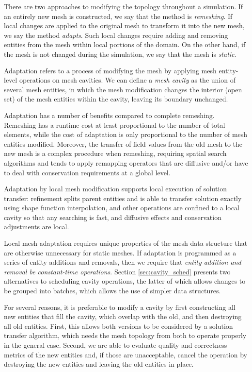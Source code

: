 There are two approaches to modifying the topology throughout
a simulation.
If an entirely new mesh is constructed, we say that the
method is {\it remeshing}.
If local changes are applied to the original mesh to transform
it into the new mesh, we say the method {\it adapts}.
Such local changes require adding and removing entities
from the mesh within local portions of the domain.
On the other hand, if the mesh is not changed during the
simulation, we say that the mesh is {\it static}.

Adaptation refers to a process of modifying the mesh by applying
mesh entity-level operations on mesh cavities.
We can define a {\it mesh cavity} as the
union of several mesh entities, in which the
mesh modification changes the interior (open set) of
the mesh entities within the cavity, leaving its boundary unchanged.

Adaptation has a number of benefits compared to complete remeshing.
Remeshing has a runtime cost at least proportional to the number
of total elements, while the cost of adaptation is only proportional
to the number of mesh entities modified.
Moreover, the transfer of field values from the old mesh
to the new mesh is a complex procedure when remeshing,
requiring spatial search algorithms and
tends to apply remapping operators that are diffusive and/or
have to deal with conservation requirements at a global level.

Adaptation by local mesh modification supports local execution
of solution transfer: refinement splits
parent entities and is able to transfer solution exactly using
shape function interpolation, and other operations are confined
to a local cavity so that any searching is fast,
and diffusive effects and conservation adjustments are local.

Local mesh adaptation requires unique properties of the
mesh data structure that are otherwise unnecessary for
static meshes.
If adaptation is programmed as a series of entity
additions and removals, then we require that \emph{entity
addition and removal be constant-time operations}.
Section \ref{sec:cavity_sched} presents two alternatives
to scheduling cavity operations, the latter of which
allows changes to be grouped into batches, which allows
the use of simpler data structures.

For several reasons, it is preferable to modify a cavity
by first constructing all new entities that fill the cavity,
which overlap with the old, and then destroying all old entities.
First, this allows both versions to be considered by a solution
transfer algorithm, which needs the mesh topology from both
to operate properly in the general case.
Second, we are able to evaluate quality and correctness metrics
of the new entities and, if those are unacceptable, cancel the
operation by destroying the new entities and leaving
the old entities in place.


